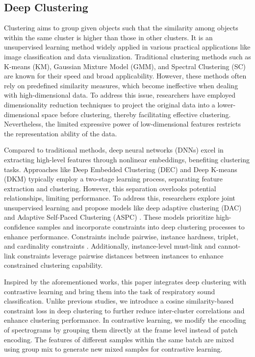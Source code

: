 \subsection{Deep Clustering}
Clustering aims to group given objects such that the similarity among objects within the same cluster is higher than those in other clusters. It is an unsupervised learning method widely applied in various practical applications like image classification and data visualization. Traditional clustering methods such as K-means (KM), Gaussian Mixture Model (GMM), and Spectral Clustering (SC) are known for their speed and broad applicability. However, these methods often rely on predefined similarity measures, which become ineffective when dealing with high-dimensional data. To address this issue, researchers have employed dimensionality reduction techniques to project the original data into a lower-dimensional space before clustering, thereby facilitating effective clustering. Nevertheless, the limited expressive power of low-dimensional features restricts the representation ability of the data.


Compared to traditional methods, deep neural networks (DNNs) excel in extracting high-level features through nonlinear embeddings, benefiting clustering tasks. Approaches like Deep Embedded Clustering (DEC) \cite{xie2016unsupervised} and Deep K-means (DKM) \cite{fard2020deep} typically employ a two-stage learning process, separating feature extraction and clustering. However, this separation overlooks potential relationships, limiting performance. To address this, researchers explore joint unsupervised learning \cite{yang2016joint} and propose models like deep adaptive clustering (DAC) \cite{chang2017deep} and Adaptive Self-Paced Clustering (ASPC) \cite{guo2019adaptive}. These models prioritize high-confidence samples and incorporate constraints into deep clustering processes to enhance performance. Constraints include pairwise, instance hardness, triplet, and cardinality constraints \cite{zhang2021framework}. Additionally, instance-level must-link and cannot-link constraints \cite{gonzalez2020agglomerative} leverage pairwise distances between instances to enhance constrained clustering capability.




Inspired by the aforementioned works, this paper integrates deep clustering with contrastive learning and bring them into the task of respiratory sound classification. Unlike previous studies, we introduce a cosine similarity-based constraint loss in deep clustering to further reduce inter-cluster correlations and enhance clustering performance. In contrastive learning, we modify the encoding of spectrograms by grouping them directly at the frame level instead of patch encoding. The features of different samples within the same batch are mixed using group mix to generate new mixed samples for contrastive learning.
